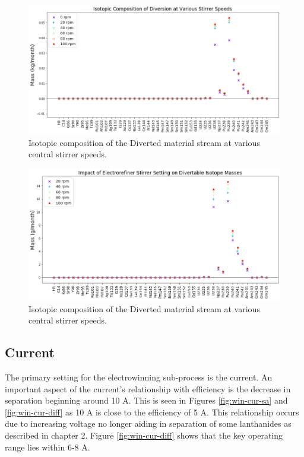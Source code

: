 \begin{figure}
	\includegraphics[width=\linewidth]{images/rotation-sa-comp}
	\caption{Isotopic composition of the Diverted material stream at various central stirrer speeds.}
	\label{fig:ref-rot-sa}
\end{figure}

\begin{figure}
	\includegraphics[width=\linewidth]{images/rotation-sa-diff}
	\caption{Isotopic composition of the Diverted material stream at various central stirrer speeds.}
	\label{fig:ref-rot-diff}
\end{figure}

\subsection{Current}

The primary setting for the electrowinning sub-process is the current. An important aspect of
the current's relationship with efficiency is the decrease in separation beginning around 10 A.
This is seen in Figures \ref{fig:win-cur-sa} and \ref{fig:win-cur-diff} as 10 A is close to the efficiency of 5 A. This relationship occurs due to increasing voltage no longer aiding in separation of some lanthanides as described in chapter 2. Figure \ref{fig:win-cur-diff} shows that the key operating range lies within 6-8 A.

